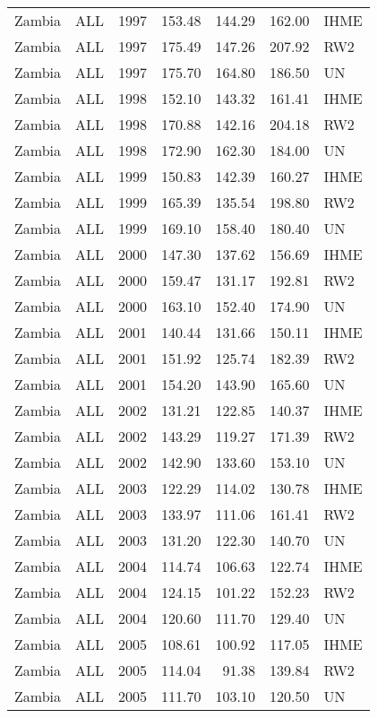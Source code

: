 \begin{longtable}{lllrrrl}
  Zambia & ALL & 1997 & 153.48 & 144.29 & 162.00 & IHME \\ 
  Zambia & ALL & 1997 & 175.49 & 147.26 & 207.92 & RW2 \\ 
  Zambia & ALL & 1997 & 175.70 & 164.80 & 186.50 & UN \\ 
  Zambia & ALL & 1998 & 152.10 & 143.32 & 161.41 & IHME \\ 
  Zambia & ALL & 1998 & 170.88 & 142.16 & 204.18 & RW2 \\ 
  Zambia & ALL & 1998 & 172.90 & 162.30 & 184.00 & UN \\ 
  Zambia & ALL & 1999 & 150.83 & 142.39 & 160.27 & IHME \\ 
  Zambia & ALL & 1999 & 165.39 & 135.54 & 198.80 & RW2 \\ 
  Zambia & ALL & 1999 & 169.10 & 158.40 & 180.40 & UN \\ 
  Zambia & ALL & 2000 & 147.30 & 137.62 & 156.69 & IHME \\ 
  Zambia & ALL & 2000 & 159.47 & 131.17 & 192.81 & RW2 \\ 
  Zambia & ALL & 2000 & 163.10 & 152.40 & 174.90 & UN \\ 
  Zambia & ALL & 2001 & 140.44 & 131.66 & 150.11 & IHME \\ 
  Zambia & ALL & 2001 & 151.92 & 125.74 & 182.39 & RW2 \\ 
  Zambia & ALL & 2001 & 154.20 & 143.90 & 165.60 & UN \\ 
  Zambia & ALL & 2002 & 131.21 & 122.85 & 140.37 & IHME \\ 
  Zambia & ALL & 2002 & 143.29 & 119.27 & 171.39 & RW2 \\ 
  Zambia & ALL & 2002 & 142.90 & 133.60 & 153.10 & UN \\ 
  Zambia & ALL & 2003 & 122.29 & 114.02 & 130.78 & IHME \\ 
  Zambia & ALL & 2003 & 133.97 & 111.06 & 161.41 & RW2 \\ 
  Zambia & ALL & 2003 & 131.20 & 122.30 & 140.70 & UN \\ 
  Zambia & ALL & 2004 & 114.74 & 106.63 & 122.74 & IHME \\ 
  Zambia & ALL & 2004 & 124.15 & 101.22 & 152.23 & RW2 \\ 
  Zambia & ALL & 2004 & 120.60 & 111.70 & 129.40 & UN \\ 
  Zambia & ALL & 2005 & 108.61 & 100.92 & 117.05 & IHME \\ 
  Zambia & ALL & 2005 & 114.04 & 91.38 & 139.84 & RW2 \\ 
  Zambia & ALL & 2005 & 111.70 & 103.10 & 120.50 & UN \\ 

\end{longtable}
